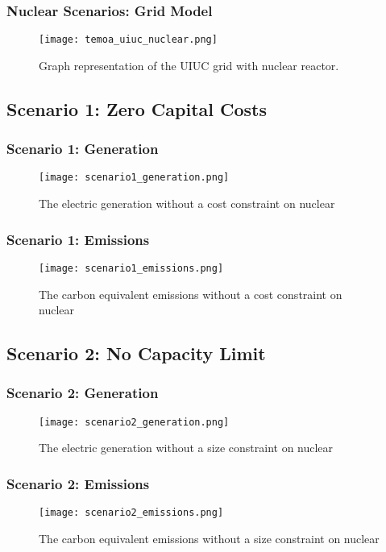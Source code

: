 \begin{frame}
  \frametitle{Nuclear Scenarios: Grid Model}
  \begin{figure}
    \texttt{[image: temoa\_uiuc\_nuclear.png]}
    \caption{Graph representation of the UIUC grid with nuclear reactor.}
    \label{fig:nuclear-uiuc}
  \end{figure}
\end{frame}


\subsection{Scenario 1: Zero Capital Costs}
\begin{frame}
  \frametitle{Scenario 1: Generation}
    \begin{figure}
      \texttt{[image: scenario1\_generation.png]}
      \caption{The electric generation without a cost constraint on nuclear}
      \label{fig:gen01}
    \end{figure}
\end{frame}
\begin{frame}
  \frametitle{Scenario 1: Emissions}
  \begin{figure}
    \texttt{[image: scenario1\_emissions.png]}
    \caption{The carbon equivalent emissions without a cost constraint on nuclear}
    \label{fig:emit01}
  \end{figure}
\end{frame}
\subsection{Scenario 2: No Capacity Limit}
\begin{frame}
  \frametitle{Scenario 2: Generation}
  \begin{figure}
    \texttt{[image: scenario2\_generation.png]}
    \caption{The electric generation without a size constraint on nuclear}
    \label{fig:gen02}
  \end{figure}
\end{frame}
\begin{frame}
  \frametitle{Scenario 2: Emissions}
  \begin{figure}
    \texttt{[image: scenario2\_emissions.png]}
    \caption{The carbon equivalent emissions without a size constraint on nuclear}
    \label{fig:emit02}
  \end{figure}
\end{frame}
